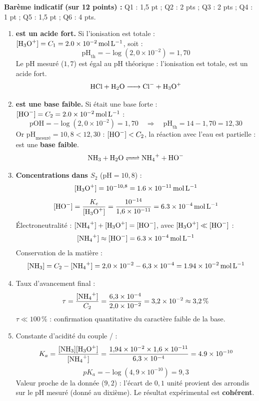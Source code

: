 \documentclass[11pt]{article}
\begin{document}
\begin{corrige}
\textbf{Barème indicatif (sur 12 points) :} Q1 : 1,5 pt ; Q2 : 2 pts ; Q3 : 2 pts ; Q4 : 1 pt ; Q5 : 1,5 pt ; Q6 : 4 pts.

\begin{enumerate}
\item \textbf{ est un acide fort.} Si l'ionisation est totale : $[\ce{H3O+}] = C_1 = \SI{2,0e-2}{mol.L^{-1}}$, soit :
\[ \mathrm{pH}_{\text{th}} = -\log(2{,}0\times10^{-2}) = 1{,}70 \]
Le pH mesuré ($1{,}7$) est égal au pH théorique : l'ionisation est totale,  est un acide fort.
\[ \ce{HCl + H2O -> Cl- + H3O+} \]

\item \textbf{ est une base faible.} Si  était une base forte : $[\ce{HO-}] = C_2 = \SI{2,0e-2}{mol.L^{-1}}$ :
\[ \mathrm{pOH} = -\log(2{,}0\times10^{-2}) = 1{,}70 \quad \Rightarrow \quad \mathrm{pH}_{\text{th}} = 14 - 1{,}70 = 12{,}30 \]
Or $\mathrm{pH}_{\text{mesuré}} = 10{,}8 < 12{,}30$ : $[\ce{HO-}] < C_2$, la réaction avec l'eau est partielle :  est une \textbf{base faible}.
\[ \ce{NH3 + H2O <=> NH4+ + HO-} \]

\item \textbf{Concentrations dans $S_2$} ($\mathrm{pH} = 10{,}8$) :
\[ [\ce{H3O+}] = 10^{-10{,}8} = \SI{1,6e-11}{mol.L^{-1}} \]
\[ [\ce{HO-}] = \frac{K_e}{[\ce{H3O+}]} = \frac{10^{-14}}{1{,}6\times10^{-11}} = \SI{6,3e-4}{mol.L^{-1}} \]
Électroneutralité : $[\ce{NH4+}] + [\ce{H3O+}] = [\ce{HO-}]$, avec $[\ce{H3O+}] \ll [\ce{HO-}]$ :
\[ [\ce{NH4+}] \approx [\ce{HO-}] = \SI{6,3e-4}{mol.L^{-1}} \]
Conservation de la matière :
\[ [\ce{NH3}] = C_2 - [\ce{NH4+}] = 2{,}0\times10^{-2} - 6{,}3\times10^{-4} = \SI{1,94e-2}{mol.L^{-1}} \]

\item Taux d'avancement final :
\[ \tau = \frac{[\ce{NH4+}]}{C_2} = \frac{6{,}3\times10^{-4}}{2{,}0\times10^{-2}} = 3{,}2\times10^{-2} \approx 3{,}2\,\% \]
$\tau \ll 100\,\%$ : confirmation quantitative du caractère faible de la base.

\item Constante d'acidité du couple / :
\[ K_a = \frac{[\ce{NH3}][\ce{H3O+}]}{[\ce{NH4+}]} = \frac{1{,}94\times10^{-2} \times 1{,}6\times10^{-11}}{6{,}3\times10^{-4}} = \SI{4,9e-10}{} \]
\[ pK_a = -\log(4{,}9\times10^{-10}) = 9{,}3 \]
Valeur proche de la donnée ($9{,}2$) : l'écart de $0{,}1$ unité provient des arrondis sur le pH mesuré (donné au dixième). Le résultat expérimental est \textbf{cohérent}.


\end{enumerate}
\end{corrige}
\end{document}

